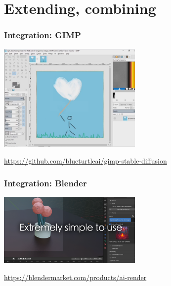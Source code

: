 \documentclass[17pt,aspectratio=169,hyperref={pdfusetitle,colorlinks,allcolors=olive}]{beamer}
\begin{document}
\section{Extending, combining}

\begin{frame}[fragile]
  \frametitle{Integration: GIMP}

    \begin{center}
    \includegraphics[width=7cm]{figs/sd-gimp}
  \end{center}

  \begin{flushright}
    {\scriptsize
    \url{https://github.com/blueturtleai/gimp-stable-diffusion} \\
    }
  \end{flushright}
  
\end{frame}

\begin{frame}[fragile]
  \frametitle{Integration: Blender}

    \begin{center}
    \includegraphics[width=7cm]{figs/sd-blender}
  \end{center}

  \begin{flushright}
    {\scriptsize
    \url{https://blendermarket.com/products/ai-render} \\
    }
  \end{flushright}
  
\end{frame}
\end{document}
